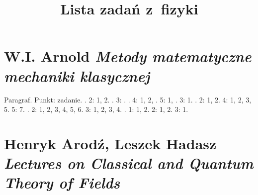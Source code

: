 \documentclass[a4paper,11pt]{article}
\title{Lista zadań z~fizyki}
\numberwithin{equation}{section}
\begin{document}





\maketitle





\section{W.I. Arnold \textit{Metody matematyczne mechaniki
    klasycznej}}

\label{sec:Oznaczenia-i-konwencje}


\noindent
Paragraf. Punkt: zadanie.  . 2: 1, 2. . 3: .
. 4: 1, 2, . 5: 1, . 3: 1.
. 2: 1, 2. 4: 1, 2, 3, 5. 5: 7. . 2: 1, 2, 3,
4, 5, 6. 3: 1, 2, 3, 4. . 1: 1, 2. 2: 1, 2. 3: 1.










\section{Henryk Arodź, Leszek Hadasz \textit{Lectures on
    Classical and Quantum Theory of Fields}}

\label{sec:Oznaczenia-i-konwencje}
\end{document}
